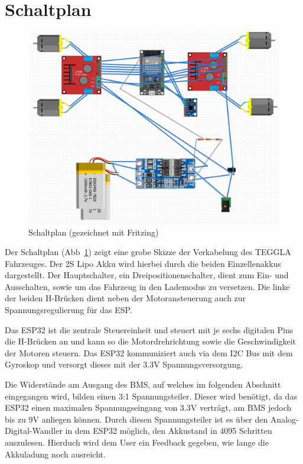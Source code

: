 \section{Schaltplan}
\begin{figure}[!ht]
	\centering
	\includegraphics[width=\textwidth]{bilder/schaltplan.png}
	\caption{Schaltplan (gezeichnet mit Fritzing)}
	\label{bild:schaltpaln}
\end{figure}
Der Schaltplan (Abb~\ref{bild:schaltpaln}) zeigt eine grobe Skizze der Verkabelung des TEGGLA Fahrzeuges. Der 2S Lipo Akku wird hierbei durch die beiden Einzellenakkus dargestellt.
Der Hauptschalter, ein Dreipositionenschalter, dient zum Ein- und Ausschalten, sowie um das Fahrzeug in den Lademodus zu versetzen. 
Die linke der beiden H-Brücken dient neben der Motoransteuerung auch zur Spannungsregulierung für das ESP. 

Das ESP32 ist die zentrale Steuereinheit und steuert mit je sechs digitalen Pins die H-Brücken an und kann so die Motordrehrichtung sowie die Geschwindigkeit der Motoren steuern.
Das ESP32 kommuniziert auch via dem I2C Bus mit dem Gyroskop und versorgt dieses mit der 3.3V Spannungsversorgung.

Die Widerstände am Ausgang des BMS, auf welches im folgenden Abschnitt eingegangen wird, bilden einen 3:1 Spannungsteiler.
Dieser wird benötigt, da das ESP32 einen maximalen Spannungseingang von 3.3V verträgt, am BMS jedoch bis zu 9V anliegen können. Durch diesen Spannungsteiler ist es über den Analog-Digital-Wandler in dem ESP32 möglich, den Akkustand in 4095 Schritten auszulesen.
Hierduch wird dem User ein Feedback gegeben, wie lange die Akkuladung noch ausreicht.

